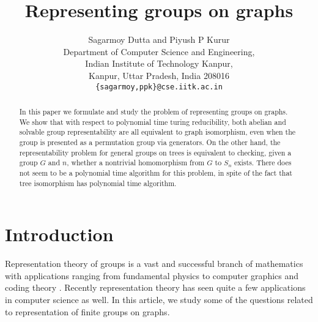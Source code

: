 \documentclass[a4paper,11pt]{article}
\begin{document}
\title{Representing groups on graphs}
\author{Sagarmoy Dutta and Piyush P Kurur\\
  Department of Computer Science and Engineering,\\
  Indian Institute of Technology Kanpur,\\
  Kanpur, Uttar Pradesh, India 208016\\
  {\tt \{sagarmoy,ppk\}@cse.iitk.ac.in}
}
\date{}
\maketitle

\begin{abstract}
  In this paper we formulate and study the problem of representing
  groups on graphs. We show that with respect to polynomial time
  turing reducibility, both abelian and solvable group
  representability are all equivalent to graph isomorphism, even when
  the group is presented as a permutation group via generators. On the
  other hand, the representability problem for general groups on trees
  is equivalent to checking, given a group $G$ and $n$, whether a
  nontrivial homomorphism from $G$ to $S_n$ exists.  There does not
  seem to be a polynomial time algorithm for this problem, in spite of
  the fact that tree isomorphism has polynomial time algorithm.
\end{abstract}

\section{Introduction}

Representation theory of groups is a vast and successful branch of
mathematics with applications ranging from fundamental physics to
computer graphics and coding theory \cite{repRealworld}. Recently
representation theory has seen quite a few applications in computer
science as well.  In this article, we study some of the questions
related to representation of finite groups on graphs.
\end{document}
